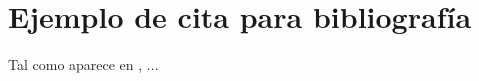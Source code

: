 \documentclass{\ClassPath/viu-tfm-template}
\begin{document}
    \coverpage

    \tableofcontents

    \chapter{Ejemplo de cita para bibliografía}
    Tal como aparece en \textcite{einstein}, ...

    \Blinddocument %

    \printbibliography[title={Referencias bibliográficas},heading=bibintoc]
\end{document}
